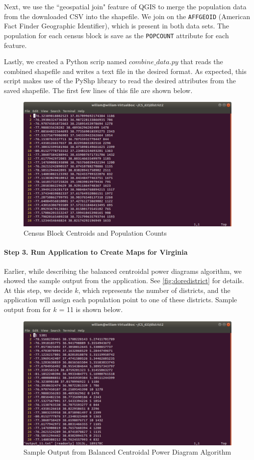 \documentclass[11pt]{article}
\begin{document}
Next, we use the ``geospatial join" feature of QGIS to merge the population data from the downloaded CSV into the shapefile. We join on the \texttt{AFFGEOID} (American Fact Finder Geographic Identifier), which is present in both data sets. The population for each census block is save as the \texttt{POPCOUNT} attribute for each feature.

\medskip

Lastly, we created a Python scrip named $combine\_data.py$ that reads the combined shapefile and writes a text file in the desired format. As expected, this script makes use of the PyShp library to read the desired attributes from the saved shapefile. The first few lines of this file are shown below.

\begin{figure}[H]
	\centering
	\includegraphics[width=.55\textwidth]{cbfile}
	\caption{Census Block Centroids and Population Counts}
	\label{fig:cbfsturfff}
\end{figure}

\paragraph{Step 3. Run Application to Create Maps for Virginia}

Earlier, while describing the balanced centroidal power diagrams algorithm, we showed the sample output from the application. See \ref{fig:doredistrict} for details. At this step, we decide $k$, which represents the number of districts, and the application will assign each population point to one of these districts. Sample output from for $k$ = 11 is shown below.

\begin{figure}[H]
	\centering
	\includegraphics[width=.55\textwidth]{appoutput}
	\caption{Sample Output from Balanced Centroidal Power Diagram Algorithm}
	\label{fig:outputzzz}
\end{figure}
\end{document}
